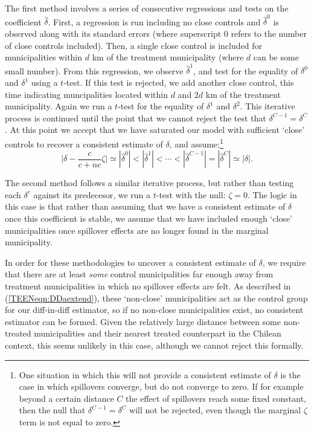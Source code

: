The first method involves a series of consecutive regressions and tests on the
coefficient $\widehat\delta$.  First, a regression is run including no close
controls and $\hat\delta^0$ is observed along with its standard errors (where 
superscript 0 refers to the number of close controls included).  Then, a single
close control is included for municipalities within $d$ km of the treatment
municipality (where $d$ can be some small number).  From this regression, we
observe $\hat\delta^1$, and test for the equality of $\delta^0$  and $\delta^1$ 
using a $t$-test.  If this test is rejected, we add another close control, 
this time indicating muncipalities located within $d$ and $2d$ km of the 
treatment municipality.  Again we run a $t$-test for the equality of $\delta^1$ 
and $\delta^2$.  This iterative process is continued until the point that we 
cannot reject the test that $\delta^{C-1}=\delta^C$.  At this point we accept 
that we have saturated our model with sufficient `close' controls to recover 
a consistent estimate of $\delta$, and assume:\footnote{One situation in which 
this will not provide a consistent estimate of $\delta$ is the case in which 
spillovers converge, but do not converge to zero.  If for example beyond a 
certain distance $C$ the effect of spillovers reach some fixed constant, then 
the null that $\delta^{C-1}=\delta^C$ will not be rejected, even though the 
marginal $\zeta$ term is not equal to zero.}
\begin{equation}
\bigg|\delta-\frac{c}{c+nc}\zeta\bigg|\simeq|\hat\delta^0|<|\hat\delta^1|<\cdots<
|\hat\delta^{C-1}|=|\hat\delta^C|\simeq|\delta|.
\end{equation}

The second method follows a similar iterative process, but rather than testing
each $\delta^c$ against its predecesor, we run a $t$-test with the null:
$\zeta=0$.  The logic in this case is that rather than assuming that we
have a consistent estimate of $\delta$ once this coefficient is stable, we
assume that we have included enough `close' municipalities once spillover effects
are no longer found in the marginal municipality.

In order for these methodologies to uncover a consistent estimate of $\delta$,
we require that there are at least \emph{some} control municipalities far enough 
away from treatment municipalities in which no 
spillover effects are felt.  As described in (\ref{TEENeqn:DDaextend}), these 
`non-close' municipalities act as the control group for our diff-in-diff estimator, 
so if no non-close municipalities exist, no consistent estimator can be formed.  
Given the relatively large distance between some non-treated municipalities and 
their nearest treated counterpart in the Chilean context, this seems unlikely in 
this case, although we cannot reject this formally.

